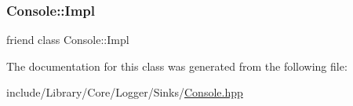 \subsubsection{\texorpdfstring{Console\+::\+Impl}{Console::Impl}}
{\footnotesize\ttfamily friend class Console\+::\+Impl\hspace{0.3cm}{\ttfamily [friend]}}



The documentation for this class was generated from the following file\+:\begin{DoxyCompactItemize}
\item 
include/\+Library/\+Core/\+Logger/\+Sinks/\hyperlink{_console_8hpp}{Console.\+hpp}\end{DoxyCompactItemize}
